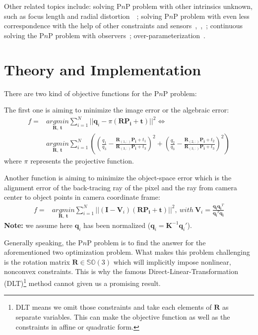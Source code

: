 \documentclass[a4paper]{report}
\begin{document}
Other related topics include: solving P$n$P problem with other intrinsics unknown, such as focus length and radial distortion~\cite{pop00010}~\cite{zheng2016direct}; solving P$n$P problem with even less correspondence with the help of other constraints and sensors~\cite{pylvanainen2009revisiting},~\cite{d2014use},~\cite{d2013use}; continuous solving the P$n$P problem with observers~\cite{pop00016}; over-parameterization~\cite{pop00018}.

\section{Theory and Implementation}
There are two kind of objective functions for the P$n$P problem:

The first one is aiming to minimize the image error or the algebraic error:
\begin{align*}
f =& \underset{\mathbf{R},\ \mathbf{t}}{argmin} \sum_{i=1}^{N}||\mathbf{q}_i-\pi(\mathbf{R}\mathbf{P_i}+\mathbf{t})||^2 \Leftrightarrow \\
 &\underset{\mathbf{R},\ \mathbf{t}}{argmin} \sum_{i=1}^{N}\left((\frac{q_1}{q_3}-\frac{\mathbf{R}_(1,:)\mathbf{P_i}+t_1}{\mathbf{R}_(3,:)\mathbf{P_i}+t_3})^{2}+(\frac{q_2}{q_3}-\frac{\mathbf{R}_(2,:)\mathbf{P_i}+t_2}{\mathbf{R}_(3,:)\mathbf{P_i}+t_3})^{2}
 \right)
\end{align*}
where $\pi$ represents the projective function.

Another function is aiming to minimize the object-space error which is the alignment error of the back-tracing ray of the pixel and the ray from camera center to object points in camera coordinate frame:
\begin{align*}
f =& \underset{\mathbf{R},\ \mathbf{t}}{argmin} \sum_{i=1}^{N}||(\mathbf{I}-\mathbf{V}_i)(\mathbf{R}\mathbf{P_i}+\mathbf{t})||^2,\ with\ \mathbf{V}_i = \frac{\mathbf{q_iq_i}^T}{\mathbf{q_i}^T\mathbf{q_i}}
\end{align*}
\textbf{Note:} we assume here $\mathbf{q}_i$ has been normalized ($\mathbf{q}_i = \mathbf{K}^{-1}\mathbf{q}_i'$).

Generally speaking, the P$n$P problem is to find the answer for the aforementioned two optimization problem. What makes this problem challenging is the rotation matrix $\mathbf{R}\in \mathbb{SO}(3)$ which will implicitly impose nonlinear, nonconvex constraints. This is why the famous Direct-Linear-Transformation (DLT)\footnote{DLT means we omit those constraints and take each elements of $\mathbf{R}$ as separate variables. This can make the objective function as well as the constraints in affine or quadratic form.} method cannot given us a promising result.
\end{document}
